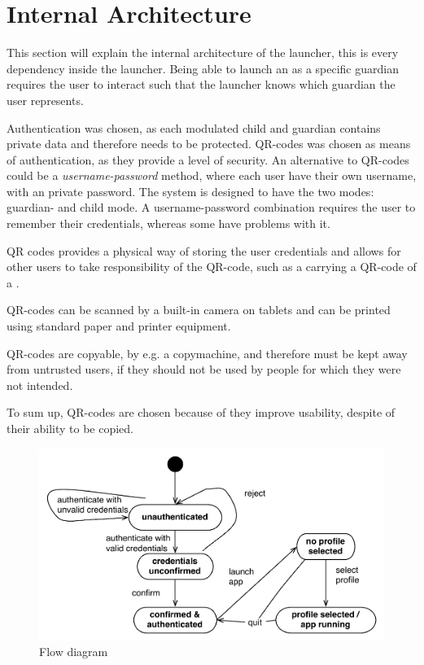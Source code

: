 \section{Internal Architecture}
This section will explain the internal architecture of the launcher, this is every dependency inside the launcher.
Being able to launch an \girafapp[] as a specific guardian requires the user to interact such that the launcher knows which guardian the user represents.

Authentication was chosen, as each modulated child and guardian contains private data and therefore needs to be protected. QR-codes was chosen as means of authentication, as they provide a level of security.
An alternative to QR-codes could be a \emph{username-password} method, where each user have their own username, with an private password. The system is designed to have the two modes: guardian- and child mode. A username-password combination requires the user to remember their credentials, whereas some \autists[] have problems with it. 

QR codes provides a physical way of storing the user credentials and allows for other users to take responsibility of the QR-code, such as a \guardian[] carrying a QR-code of a \autist[].

QR-codes can be scanned by a built-in camera on tablets and can be printed using standard paper and printer equipment. 

QR-codes are copyable, by e.g. a copymachine, and therefore must be kept away from untrusted users, if they should not be used by people for which they were not intended.

To sum up, QR-codes are chosen because of they improve usability, despite of their ability to be copied.



\begin{figure}[h]
	\centering
	\includegraphics[width=1\textwidth]{gfx/flow-diagram2.pdf}
	\caption{Flow diagram}
	\label{fig:flow_diagram}
\end{figure}

